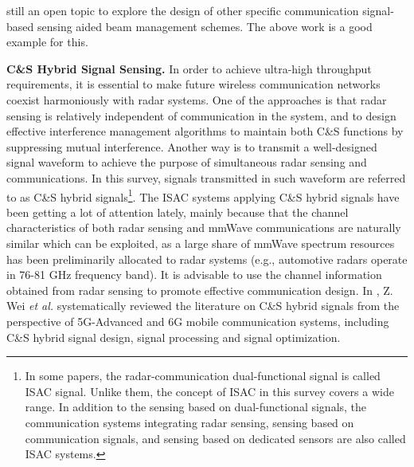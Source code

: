 \documentclass[journal,comsoc]{IEEEtran}
\begin{document}
still an open topic to explore the design of other specific communication signal-based sensing aided beam management schemes. The above work is a good example for this.



{\bf{C\&S Hybrid Signal Sensing.}} In order to achieve ultra-high throughput requirements, it is essential to make future wireless communication networks coexist harmoniously with radar systems. One of the approaches is that radar sensing is relatively independent of communication in the system, and to design effective interference management algorithms to maintain both C\&S functions by suppressing mutual interference. Another way is to transmit a well-designed signal waveform to achieve the purpose of simultaneous radar sensing and communications. In this survey, signals transmitted in such waveform are referred to as C\&S hybrid signals\footnote{In some papers, the radar-communication dual-functional signal is called ISAC signal. Unlike them, the concept of ISAC in this survey covers a wide range. In addition to the sensing based on dual-functional signals, the communication systems integrating radar sensing, sensing based on communication signals, and sensing based on dedicated sensors are also called ISAC systems.}. The ISAC systems applying C\&S hybrid signals have been getting a lot of attention lately, mainly because that the channel characteristics of both radar sensing and mmWave communications are naturally similar which can be exploited, as a large share of mmWave spectrum resources has been preliminarily allocated to radar systems (e.g., automotive radars operate in 76-81 GHz frequency band). It is advisable to use the channel information obtained from radar sensing to promote effective communication design. In \cite{ISAC-signal-Survey-2023}, Z. Wei \emph{et al.} systematically reviewed the literature on C\&S hybrid signals from the perspective of 5G-Advanced and 6G mobile communication systems, including C\&S hybrid signal design, signal processing and signal optimization.
\end{document}

